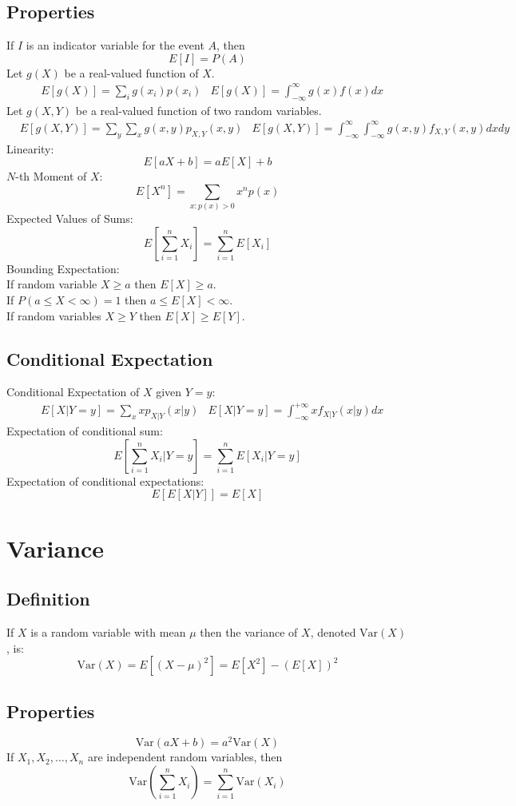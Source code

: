 \documentclass[12pt]{article}
\newcommand{\Var}{\text{Var}}
\begin{document}
\subsection{Properties}
If $I$ is an indicator variable for the event $A$, then
\[
    E[I] = P(A)
\]
Let $g(X)$ be a real-valued function of $X$.
\begin{align*}
    &E[g(X)] = \sum_{i} g(x_i)p(x_i) &E[g(X)] = \int_{-\infty}^{\infty} g(x) f(x) dx
\end{align*}
Let $g(X,Y)$ be a real-valued function of two random variables.
\begin{align*}
    &E[g(X,Y)] = \sum_y \sum_x g(x,y) p_{X,Y}(x,y)  &E[g(X,Y)] = \int_{-\infty}^{\infty} \int_{-\infty}^{\infty} g(x,y) f_{X,Y}(x,y) dx dy
\end{align*}
Linearity:
\[
    E[aX + b]  = aE[X] + b
\]
$N$-th Moment of $X$:
\[
    E[X^n] = \sum_{x: p(x) > 0} x^n p(x)
\]
Expected Values of Sums:
\[
    E\left[ \sum_{i=1}^n X_i \right] = \sum_{i=1}^n E[X_i]
\]
Bounding Expectation:\\
If random variable $X \geq a$ then $E[X] \geq a$. \\
If $P(a \leq X < \infty) = 1$ then $a \leq E[X] < \infty$. \\
If random variables $X \geq Y$ then $E[X] \geq E[Y]$.

\subsection{Conditional Expectation}
Conditional Expectation of $X$ given $Y=y$:
\begin{align*}
    &E[X|Y=y] = \sum_x x p_{X|Y}(x|y)   &E[X|Y=y] = \int_{-\infty}^{+\infty} x f_{X|Y} (x|y) dx
\end{align*}
Expectation of conditional sum:
\[
    E\left[ \sum_{i=1}^n X_i | Y=y \right] = \sum_{i=1}^n E[X_i | Y=y]
\]
Expectation of conditional expectations:
\[
    E[E[X|Y]] = E[X]
\]


\section{Variance}
\subsection{Definition}
If $X$ is a random variable with mean $\mu$ then the variance of $X$, denoted $\Var(X)$, is:
\[
    \Var(X) = E[(X-\mu)^2] = E[X^2] - (E[X])^2
\]
\subsection{Properties}
\[
    \Var(aX + b) = a^2\Var(X)
\]
If $X_1, X_2, \ldots, X_n$ are independent random variables, then
\[
    \Var\left( \sum_{i=1}^n X_i \right) = \sum_{i=1}^n \Var(X_i)
\]
\end{document}
